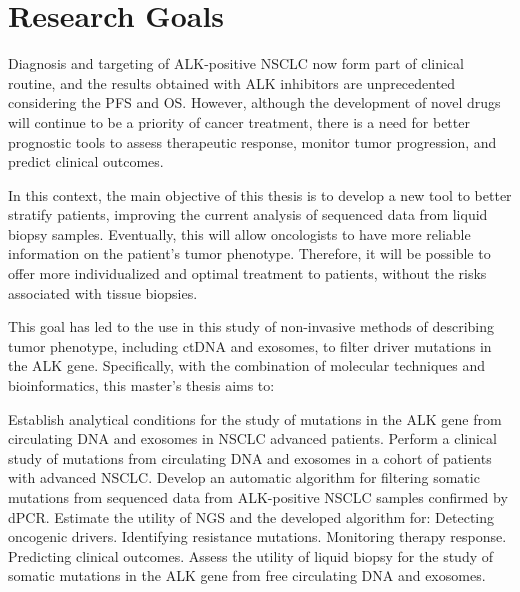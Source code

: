 \chapter{Research Goals}

Diagnosis and targeting of ALK-positive NSCLC now form part of clinical routine, and the results obtained with ALK inhibitors are unprecedented considering the PFS and OS. However, although the development of novel drugs will continue to be a priority of cancer treatment, there is a need for better prognostic tools to assess therapeutic response, monitor tumor progression, and predict clinical outcomes.

In this context, the main objective of this thesis is to develop a new tool to better stratify patients, improving the current analysis of sequenced data from liquid biopsy samples. Eventually, this will allow oncologists to have more reliable information on the patient's tumor phenotype. Therefore, it will be possible to offer more individualized and optimal treatment to patients, without the risks associated with tissue biopsies.

This goal has led to the use in this study of non-invasive methods of describing tumor phenotype, including ctDNA and exosomes, to filter driver mutations in the ALK gene. Specifically, with the combination of molecular techniques and bioinformatics, this master's thesis aims to:
\begin{outline}
    \1 Establish analytical conditions for the study of mutations in the ALK gene from circulating DNA and exosomes in NSCLC advanced patients.
    \1 Perform a clinical study of mutations from circulating DNA and exosomes in a cohort of patients with advanced NSCLC.
    \1 Develop an automatic algorithm for filtering somatic mutations from sequenced data from ALK-positive NSCLC samples confirmed by dPCR.
    \1 Estimate the utility of NGS and the developed algorithm for:
        \2 Detecting oncogenic drivers.
        \2 Identifying resistance mutations.
        \2 Monitoring therapy response.
        \2 Predicting clinical outcomes.
    \1 Assess the utility of liquid biopsy for the study of somatic mutations in the ALK gene from free circulating DNA and exosomes.
\end{outline}